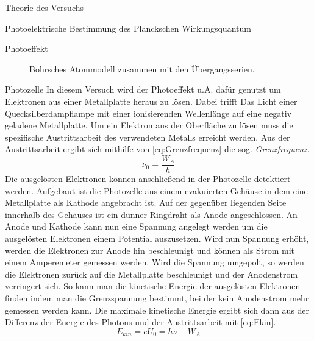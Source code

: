 \documentclass[pdftex, a4paper,11pt, twoside, ngerman]{report}
\begin{document}
\begin{chapter}{Theorie des Versuchs}
\begin{section}{Photoelektrische Bestimmung des Planckschen Wirkungsquantum}
\begin{subsection}{Photoeffekt}
\begin{figure}[htbp]
\begin{minipage}{0.48\textwidth}
            \caption{Bohrsches Atommodell zusammen mit den Übergangsserien.\cite{bib:BohrschesAtommodellSerien}}\label{fig:BohrschesAtommodellSerien}
          \end{minipage}
        \end{figure}
        
      \end{subsection}
      
      
      
      \begin{subsection}{Photozelle}
        \label{chp:TheoriePhotoelektrischesWirkungsquantumPhotozelle}
        In diesem Versuch wird der Photoeffekt u.A. dafür genutzt um Elektronen aus einer Metallplatte heraus zu lösen. Dabei trifft Das Licht einer Quecksilberdampflampe mit einer ionisierenden Wellenlänge auf eine negativ geladene Metallplatte. Um ein Elektron aus der Oberfläche zu lösen muss die spezifische Austrittsarbeit des verwendeten Metalls erreicht werden. Aus der Austrittsarbeit ergibt sich mithilfe von \cref{eq:Grenzfrequenz} die sog. \textit{Grenzfrequenz}.
        \begin{equation}
          \label{eq:Grenzfrequenz}
          \nu_{0}=\frac{W_{A}}{h}
        \end{equation}
        Die ausgelösten Elektronen können anschließend in der Photozelle detektiert werden. Aufgebaut ist die Photozelle aus einem evakuierten Gehäuse in dem eine Metallplatte als Kathode angebracht ist. Auf der gegenüber liegenden Seite innerhalb des Gehäuses ist ein dünner Ringdraht als Anode angeschlossen. An Anode und Kathode kann nun eine Spannung angelegt werden um die ausgelösten Elektronen einem Potential auszusetzen. Wird nun Spannung erhöht, werden die Elektronen zur Anode hin beschleunigt und können als Strom mit einem Amperemeter gemessen werden. Wird die Spannung umgepolt, so werden die Elektronen zurück auf die Metallplatte beschleunigt und der Anodenstrom verringert sich. So kann man die kinetische Energie der ausgelösten Elektronen finden indem man die Grenzspannung bestimmt, bei der kein Anodenstrom mehr gemessen werden kann. Die maximale kinetische Energie ergibt sich dann aus der Differenz der Energie des Photons und der Austrittsarbeit mit \cref{eq:Ekin}.
        \begin{equation}
          \label{eq:Ekin}
          E_{kin}=eU_{0}=h\nu-W_{A}
        \end{equation}
        

\end{subsection}
\end{section}
\end{chapter}
\end{document}
